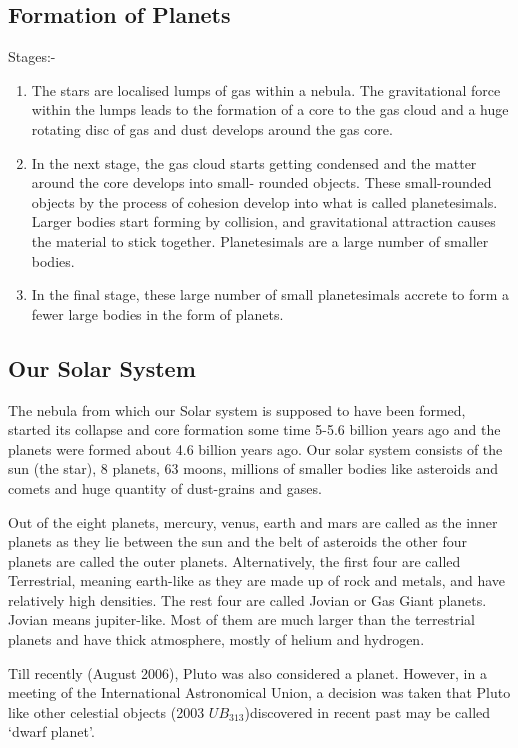 \documentclass[8pt, a4paper, oneside, twocolumn]{extarticle}
\begin{document}
\subsection{Formation of Planets}
Stages:-
\begin{enumerate}
  \item The stars are localised lumps of gas within a nebula. The gravitational force within the lumps leads to the formation of a core to the gas cloud and a huge rotating disc of gas and dust develops around the gas core.
  \item In the next stage, the gas cloud starts getting condensed and the matter around the core develops into small- rounded objects. These small-rounded objects by the process of cohesion develop into what is called planetesimals. Larger bodies start forming by collision, and gravitational attraction causes the material to stick together. Planetesimals are a large number of smaller bodies.
  \item In the final stage, these large number of small planetesimals accrete to form a fewer large bodies in the form of planets.
\end{enumerate}
\subsection{Our Solar System}
The nebula from which our Solar system is supposed to have been formed, started its collapse and core formation some time 5-5.6 billion years ago and the planets were formed about 4.6 billion years ago. Our solar system consists of the sun (the star), 8 planets, 63 moons, millions of smaller bodies like asteroids and comets and huge quantity of dust-grains and gases.

Out of the eight planets, mercury, venus, earth and mars are called as the inner planets as they lie between the sun and the belt of asteroids the other four planets are called the outer planets. Alternatively, the first four are called Terrestrial, meaning earth-like as they are made up of rock and metals, and have relatively high densities. The rest four are called Jovian or Gas Giant planets. Jovian means jupiter-like. Most of them are much larger than the terrestrial planets and have thick atmosphere, mostly of helium and hydrogen.

Till recently (August 2006), Pluto was also considered a planet. However, in a meeting of the International Astronomical Union, a decision was taken that Pluto like other celestial objects (2003 $UB_{313}$)discovered in recent past may be called ‘dwarf planet’.
\end{document}
